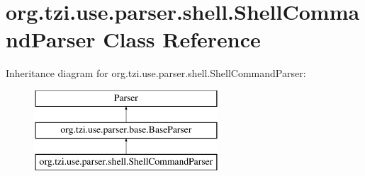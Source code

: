 \hypertarget{classorg_1_1tzi_1_1use_1_1parser_1_1shell_1_1_shell_command_parser}{\section{org.\-tzi.\-use.\-parser.\-shell.\-Shell\-Command\-Parser Class Reference}
\label{classorg_1_1tzi_1_1use_1_1parser_1_1shell_1_1_shell_command_parser}
}
Inheritance diagram for org.\-tzi.\-use.\-parser.\-shell.\-Shell\-Command\-Parser\-:\begin{figure}[H]
\begin{center}
\leavevmode
\includegraphics[height=3.000000cm]{classorg_1_1tzi_1_1use_1_1parser_1_1shell_1_1_shell_command_parser}
\end{center}
\end{figure}
